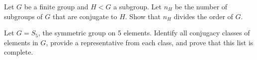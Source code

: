 \begin{problem}
\label{prob:1.10}
Let $G$ be a finite group and $H<G$ a subgroup. Let $n_H$ be the number of subgroups of $G$ that are conjugate to $H$. Show that $n_H$ divides the order of $G$.
\end{problem}

\begin{problem}
\label{prob:1.11}
Let $G=S_5$, the symmetric group on 5 elements. Identify all conjugacy classes of elements in $G$, provide a representative from each class, and prove that this list is complete.
\end{problem}
